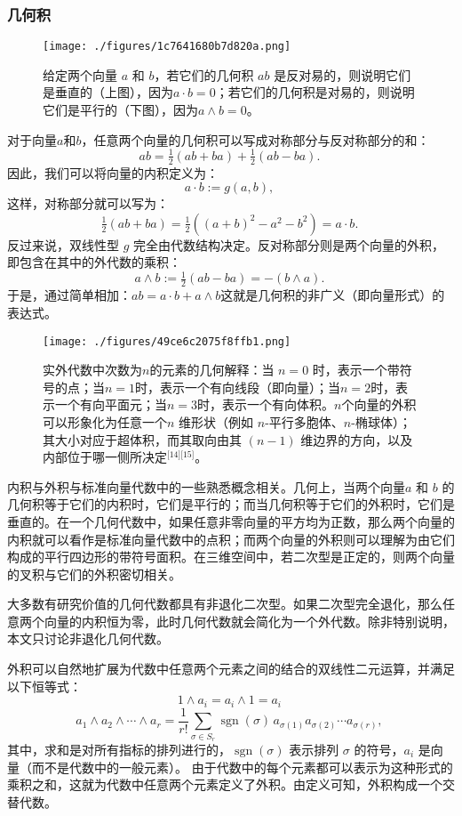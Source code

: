 \subsubsection{几何积}
\begin{figure}[ht]
\centering
\texttt{[image: ./figures/1c7641680b7d820a.png]}
\caption{给定两个向量 $a$ 和 $b$，若它们的几何积 $ab$ 是反对易的，则说明它们是垂直的（上图），因为$a \cdot b = 0$；若它们的几何积是对易的，则说明它们是平行的（下图），因为$a \wedge b = 0$。} \label{fig_jiheds_1}
\end{figure}
对于向量$a$和$b$，任意两个向量的几何积可以写成对称部分与反对称部分的和：
$$
ab = \tfrac{1}{2}(ab + ba) + \tfrac{1}{2}(ab - ba).~
$$
因此，我们可以将向量的内积定义为：
$$
a \cdot b := g(a, b),~
$$
这样，对称部分就可以写为：
$$
\tfrac{1}{2}(ab + ba) 
= \tfrac{1}{2}\left((a+b)^{2} - a^{2} - b^{2}\right) 
= a \cdot b.~
$$
反过来说，双线性型 $g$ 完全由代数结构决定。反对称部分则是两个向量的外积，即包含在其中的外代数的乘积：
$$
a \wedge b := \tfrac{1}{2}(ab - ba) = -(b \wedge a).~
$$
于是，通过简单相加：$ab = a \cdot b + a \wedge b$这就是几何积的非广义（即向量形式）的表达式。
\begin{figure}[ht]
\centering
\texttt{[image: ./figures/49ce6c2075f8ffb1.png]}
\caption{实外代数中次数为$n$的元素的几何解释：当 $n=0$ 时，表示一个带符号的点；当$n=1$时，表示一个有向线段（即向量）；当$n=2$时，表示一个有向平面元；当$n=3$时，表示一个有向体积。$n$个向量的外积可以形象化为任意一个$n$ 维形状（例如 $n$-平行多胞体、$n$-椭球体）；其大小对应于超体积，而其取向由其 $(n-1)$ 维边界的方向，以及内部位于哪一侧所决定\(^\text{[14][15]}\)。} \label{fig_jiheds_2}
\end{figure}
内积与外积与标准向量代数中的一些熟悉概念相关。几何上，当两个向量$a$ 和 $b$ 的几何积等于它们的内积时，它们是平行的；而当几何积等于它们的外积时，它们是垂直的。在一个几何代数中，如果任意非零向量的平方均为正数，那么两个向量的内积就可以看作是标准向量代数中的点积；而两个向量的外积则可以理解为由它们构成的平行四边形的带符号面积。在三维空间中，若二次型是正定的，则两个向量的叉积与它们的外积密切相关。

大多数有研究价值的几何代数都具有非退化二次型。如果二次型完全退化，那么任意两个向量的内积恒为零，此时几何代数就会简化为一个外代数。除非特别说明，本文只讨论非退化几何代数。

外积可以自然地扩展为代数中任意两个元素之间的结合的双线性二元运算，并满足以下恒等式：
$$
1 \wedge a_i = a_i \wedge 1 = a_i~
$$
$$
a_1 \wedge a_2 \wedge \cdots \wedge a_r 
= \frac{1}{r!}\sum_{\sigma \in S_r}\operatorname{sgn}(\sigma)\, a_{\sigma(1)}a_{\sigma(2)}\cdots a_{\sigma(r)},~
$$
其中，求和是对所有指标的排列进行的，$\operatorname{sgn}(\sigma)$ 表示排列 $\sigma$ 的符号，$a_i$ 是向量（而不是代数中的一般元素）。
由于代数中的每个元素都可以表示为这种形式的乘积之和，这就为代数中任意两个元素定义了外积。由定义可知，外积构成一个交替代数。

